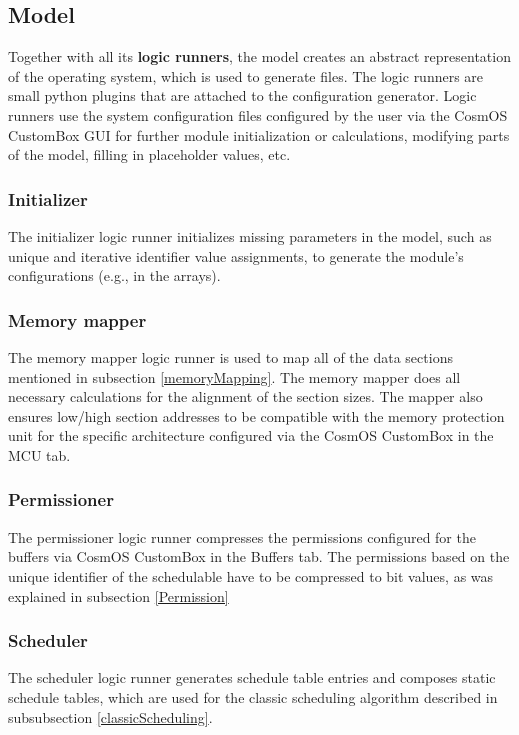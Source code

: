 \subsection{Model}
Together with all its \textbf{logic runners}, the model creates an abstract representation of the operating system, which is used to generate files. The logic runners are small python plugins that are attached to the configuration generator. Logic runners use the system configuration files configured by the user via the CosmOS CustomBox \ac{GUI} for further module initialization or calculations, modifying parts of the model, filling in placeholder values, etc.

\subsubsection{Initializer}
The initializer logic runner initializes missing parameters in the model, such as unique and iterative identifier value assignments, to generate the module's configurations (e.g., in the arrays).

\subsubsection{Memory mapper}
The memory mapper logic runner is used to map all of the data sections mentioned in subsection \ref{memoryMapping}. The memory mapper does all necessary calculations for the alignment of the section sizes. The mapper also ensures low/high section addresses to be compatible with the memory protection unit for the specific architecture configured via the CosmOS CustomBox in the \ac{MCU} tab.

\subsubsection{Permissioner}
The permissioner logic runner compresses the permissions configured for the buffers via CosmOS CustomBox in the Buffers tab. The permissions based on the unique identifier of the schedulable have to be compressed to bit values, as was explained in subsection \ref{Permission}

\subsubsection{Scheduler}
The scheduler logic runner generates schedule table entries and composes static schedule tables, which are used for the classic scheduling algorithm described in subsubsection \ref{classicScheduling}.
